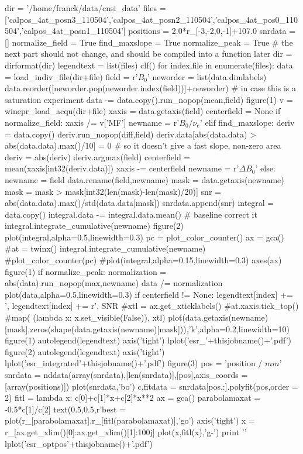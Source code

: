 {\begin{tiny}
\begin{python}
dir = '/home/franck/data/cnsi_data'
files = ['calpos_4at_posn3_110504','calpos_4at_posn2_110504','calpos_4at_pos0_110504','calpos_4at_posn1_110504']
positions = 2.0*r_[-3,-2,0,-1]+107.0
snrdata = []
normalize_field = True
find_maxslope = True
normalize_peak = True
# the next part should not change, and should be compiled into a function later
dir = dirformat(dir)
legendtext = list(files)
clf()
for index,file in enumerate(files):
   data = load_indiv_file(dir+file)
   field = r'$B_0$'
   neworder = list(data.dimlabels)
   data.reorder([neworder.pop(neworder.index(field))]+neworder) # in case this is a saturation experiment
   data -= data.copy().run_nopop(mean,field)
   figure(1)
   v = winepr_load_acqu(dir+file)
   xaxis = data.getaxis(field)
   centerfield = None
   if normalize_field:
       xaxis /= v['MF']
       newname = r'$B_0/\nu_e$'
   elif find_maxslope:
       deriv = data.copy()
       deriv.run_nopop(diff,field)
       deriv.data[abs(data.data) > abs(data.data).max()/10] = 0 # so it doesn't give a fast slope, non-zero area
       deriv = abs(deriv)
       deriv.argmax(field)
       centerfield = mean(xaxis[int32(deriv.data)])
       xaxis -= centerfield
       newname = r'$\Delta B_0$'
   else:
       newname = field
   data.rename(field,newname)
   mask = data.getaxis(newname)
   mask = mask > mask[int32(len(mask)-len(mask)/20)]
   snr = abs(data.data).max()/std(data.data[mask])
   snrdata.append(snr)
   integral = data.copy()
   integral.data -= integral.data.mean() # baseline correct it
   integral.integrate_cumulative(newname)
   figure(2)
   plot(integral,alpha=0.5,linewidth=0.3)
   pc = plot_color_counter()
   ax = gca()
   #at = twinx()
   integral.integrate_cumulative(newname)
   #plot_color_counter(pc)
   #plot(integral,alpha=0.15,linewidth=0.3)
   axes(ax)
   figure(1)
   if normalize_peak:
      normalization = abs(data).run_nopop(max,newname)
      data /= normalization
   plot(data,alpha=0.5,linewidth=0.3)
   if centerfield != None:
      legendtext[index] += ', %
   legendtext[index] += r', SNR %
#xtl = ax.get_xticklabels()
#at.xaxis.tick_top()
#map( (lambda x: x.set_visible(False)), xtl)
plot(data.getaxis(newname)[mask],zeros(shape(data.getaxis(newname)[mask])),'k',alpha=0.2,linewidth=10)
figure(1)
autolegend(legendtext)
axis('tight')
lplot('esr_'+thisjobname()+'.pdf')
figure(2)
autolegend(legendtext)
axis('tight')
lplot('esr_integrated'+thisjobname()+'.pdf')
figure(3)
pos = 'position / $mm$'
snrdata = nddata(array(snrdata),[len(snrdata)],[pos],axis_coords = [array(positions)])
plot(snrdata,'bo')
c,fitdata = snrdata[pos,:].polyfit(pos,order = 2)
fitl = lambda x: c[0]+c[1]*x+c[2]*x**2
ax = gca()
parabolamaxat = -0.5*c[1]/c[2]
text(0.5,0.5,r'best = %
plot(r_[parabolamaxat],r_[fitl(parabolamaxat)],'go')
axis('tight')
x = r_[ax.get_xlim()[0]:ax.get_xlim()[1]:100j]
plot(x,fitl(x),'g-')
print '\n\n'
lplot('esr_optpos'+thisjobname()+'.pdf')
\end{python}
\end{tiny}

}
